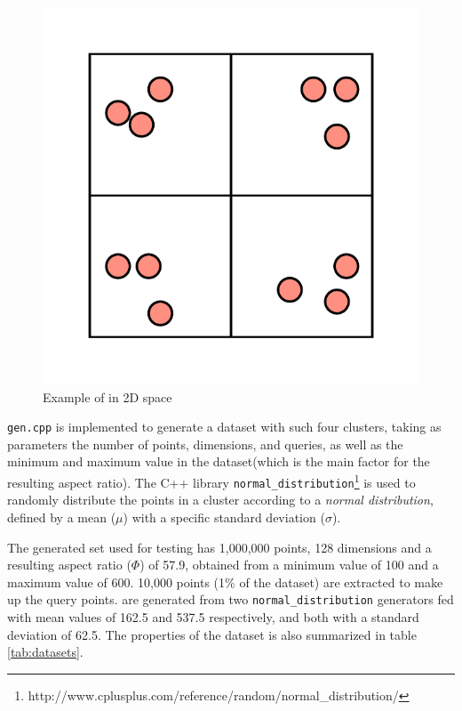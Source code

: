 \begin{figure}[h]
	\centering
	\includegraphics[scale=0.5]{figures/Clusters_example.png}
	\caption{Example of \clust{} in 2D space}
	\label{fig:clusters}
\end{figure}


\texttt{gen.cpp} is implemented to generate a dataset with such four clusters, taking as parameters the number of points, dimensions, and queries, as well as the minimum and maximum value in the dataset(which is the main factor for the resulting aspect ratio). The C++ library \texttt{normal\_distribution}\footnote{http://www.cplusplus.com/reference/random/normal\_distribution/} is used to randomly distribute the points in a cluster according to a \textit{normal distribution}, defined by a mean ($\mu$) with a specific standard deviation ($\sigma$). 

The generated set used for testing has 1,000,000 points, 128 dimensions and a resulting aspect ratio ($\Phi$) of 57.9, obtained from a minimum value of 100 and a maximum value of 600. 10,000 points (1\% of the dataset) are extracted to make up the query points. \clust{} are generated from two \texttt{normal\_distribution} generators fed with mean values of 162.5 and 537.5 respectively, and both with a standard deviation of 62.5. The properties of the dataset is also summarized in table \ref{tab:datasets}.